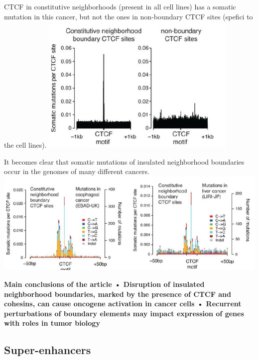CTCF in constitutive neighborhoods (present in all cell lines) has a somatic mutation in this cancer, but not the ones in non-boundary CTCF sites (spefici to the cell lines). \includegraphics{../_resources/04f2803be336c87ba295bb898a04c3e7.png}

It becomes clear that somatic mutations of insulated neighborhood boundaries occur in the genomes of many different cancers.
\includegraphics{../_resources/03aab7349f83323cba1c91cb2c3e3124.png}

\textbf{Main conclusions of the article
• Disruption of insulated neighborhood boundaries, marked by the presence of CTCF and cohesins,
can cause oncogene activation in cancer cells
• Recurrent perturbations of boundary elements may impact expression of genes with roles in
tumor biology}

\hypertarget{super-enhancers}{%
\subsection{Super-enhancers}\label{super-enhancers}}

